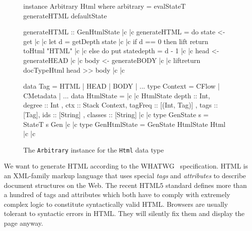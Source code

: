 \begin{figure}[!t]
  \centering
  \begin{haskell}
instance Arbitrary Html where
  arbitrary = evalStateT generateHTML defaultState

generateHTML :: GenHtmlState |c \label{ref.generateHTML.begin} |c
generateHTML = do
  state <- get |c \label{ref.generateHTML.getState} |c
  let d = getDepth state |c \label{ref.generateHTML.getDepth} |c
  if d == 0
  then lift \dollar return \dollar toHtml "HTML" |c \label{ref.generateHTML.returnString} |c
  else do put state{depth = d - 1} |c \label{ref.generateHTML.updateState} |c
           head <- generateHEAD |c \label{ref.generateHTML.newHead} |c
           body <- generateBODY |c \label{ref.generateHTML.newBody} |c
           lift\dollar return \dollar docTypeHtml \dollar head >> body |c \label{ref.generateHTML.end} |c

data Tag = HTML | HEAD | BODY | ...
type Context = CFlow | CMetadata | ...
data HtmlState = |c \label{ref.HtmlState.begin} |c
  HtmlState { depth    :: Int,           degree  :: Int
             , ctx     :: Stack Context, tagFreq :: [(Int, Tag)]
             , tags    :: [Tag],         ids     :: [String]
             , classes :: [String] } |c \label{ref.HtmlState.end} |c
type GenState s = StateT s Gen |c \label{ref.GenState} |c
type GenHtmlState = GenState HtmlState Html |c \label{ref.GenHtmlState} |c
  \end{haskell}
  \caption{The \texttt{Arbitrary} instance for the \texttt{Html} data type}
  \label{fig.html.arb.def}
\end{figure}

We want to generate HTML according to the WHATWG~\cite{htmlspec} specification. HTML is an XML-family markup language that uses special \emph{tags} and \emph{attributes} to describe document structures on the Web. The recent HTML5 standard defines more than a hundred of tags and attributes which both have to comply with extremely complex logic to constitute  syntactically valid HTML. Browsers are usually tolerant to syntactic errors in HTML. They will silently fix them and display the page anyway.

